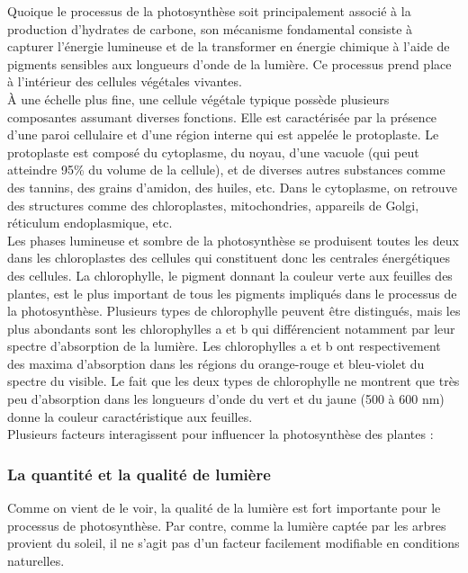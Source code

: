 Quoique le processus de la photosynthèse soit principalement associé à la production d'hydrates de carbone, son mécanisme fondamental consiste à capturer l'énergie lumineuse et de la transformer en énergie chimique à l'aide de pigments sensibles aux longueurs d'onde de la lumière. Ce processus prend place à l'intérieur des cellules végétales vivantes. \\

À une échelle plus fine, une cellule végétale typique possède plusieurs composantes assumant diverses fonctions. Elle est caractérisée par la présence d'une paroi cellulaire et d'une région interne qui est appelée le protoplaste. Le protoplaste est composé du cytoplasme, du noyau, d'une vacuole (qui peut atteindre 95\% du volume de la cellule), et de diverses autres substances comme des tannins, des grains d'amidon, des huiles, etc. Dans le cytoplasme, on retrouve des structures comme des chloroplastes, mitochondries, appareils de Golgi, réticulum endoplasmique, etc. \\

Les phases lumineuse et sombre de la photosynthèse se produisent toutes les deux dans les chloroplastes des cellules qui constituent donc les centrales énergétiques des cellules. La chlorophylle, le pigment donnant la couleur verte aux feuilles des plantes, est le plus important de tous les pigments impliqués dans le processus de la photosynthèse. Plusieurs types de chlorophylle peuvent être distingués, mais les plus abondants sont les chlorophylles a et b qui différencient notamment par leur spectre d'absorption de la lumière. Les chlorophylles a et b ont respectivement des maxima d'absorption dans les régions du orange-rouge et bleu-violet du spectre du visible. Le fait que les deux types de chlorophylle ne montrent que très peu d'absorption dans les longueurs d'onde du vert et du jaune (500 à 600 nm) donne la couleur caractéristique aux feuilles.\\

Plusieurs facteurs interagissent pour influencer la photosynthèse des plantes : 

\subsubsection{La quantité et la qualité de lumière}

Comme on vient de le voir, la qualité de la lumière est fort importante pour le processus de photosynthèse. Par contre, comme la lumière captée par les arbres provient du soleil, il ne s'agit pas d'un facteur facilement modifiable en conditions naturelles.\\

